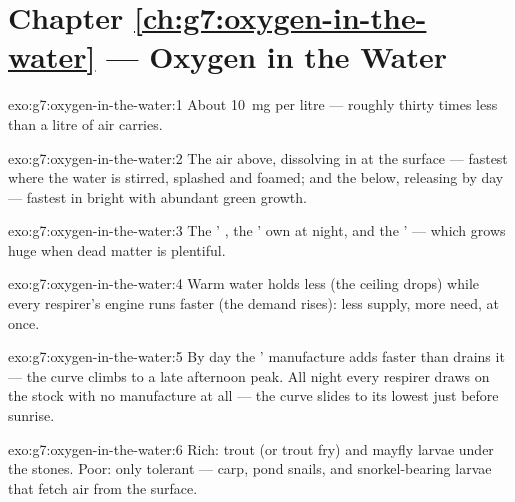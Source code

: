 \section*{Chapter \ref{ch:g7:oxygen-in-the-water} --- Oxygen in the Water}

\begin{solution}{exo:g7:oxygen-in-the-water:1}
About \qty{10}{mg} per litre --- roughly thirty times less
than a litre of air carries.
\end{solution}

\begin{solution}{exo:g7:oxygen-in-the-water:2}
The air above, dissolving in at the surface --- fastest
where the water is stirred, splashed and foamed; and the
 below, releasing  by day --- fastest in
bright  with abundant green growth.
\end{solution}

\begin{solution}{exo:g7:oxygen-in-the-water:3}
The ' , the ' own  at
night, and the ' --- which grows huge when dead
matter is plentiful.
\end{solution}

\begin{solution}{exo:g7:oxygen-in-the-water:4}
Warm water holds less  (the ceiling drops)
while every respirer's engine runs faster (the demand
rises): less supply, more need, at once.
\end{solution}

\begin{solution}{exo:g7:oxygen-in-the-water:5}
By day the ' manufacture adds  faster than
 drains it --- the curve climbs to a late
afternoon peak. All night every respirer draws on the stock
with no manufacture at all --- the curve slides to its
lowest just before sunrise.
\end{solution}

\begin{solution}{exo:g7:oxygen-in-the-water:6}
Rich: trout (or trout fry) and mayfly larvae under the
stones. Poor: only tolerant  --- carp, pond snails,
and snorkel-bearing larvae that fetch air from the surface.
\end{solution}

